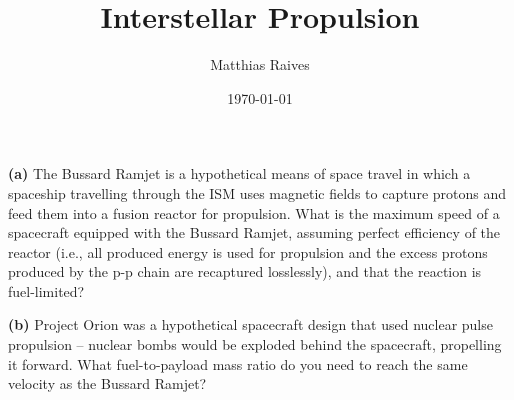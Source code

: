\documentclass[a4paper]{article}
\title{Interstellar Propulsion}
\author{Matthias Raives}
\date{\today}
\begin{document}
  
  \maketitle
  
  \textbf{(a)} The Bussard Ramjet is a hypothetical means of space travel in which a spaceship travelling through the ISM uses magnetic fields to capture protons and feed them into a fusion reactor for propulsion.  What is the maximum speed of a spacecraft equipped with the Bussard Ramjet, assuming perfect efficiency of the reactor (i.e., all produced energy is used for propulsion and the excess protons produced by the p-p chain are recaptured losslessly), and that the reaction is fuel-limited?
  
  \textbf{(b)} Project Orion was a hypothetical spacecraft design that used nuclear pulse propulsion -- nuclear bombs would be exploded behind the spacecraft, propelling it forward.  What fuel-to-payload mass ratio do you need to reach the same velocity as the Bussard Ramjet?
  
  
\end{document}

